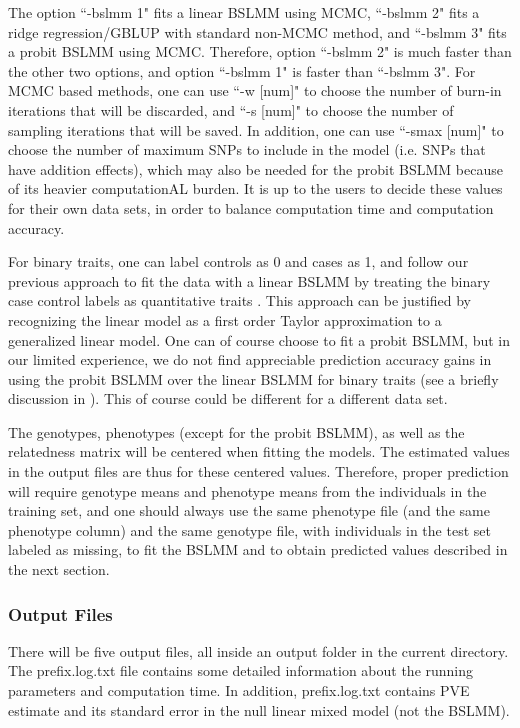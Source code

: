 \documentclass[11pt]{article}
\begin{document}
The option ``-bslmm 1" fits a linear BSLMM using MCMC, ``-bslmm 2"
fits a ridge regression/GBLUP with standard non-MCMC method, and
``-bslmm 3" fits a probit BSLMM using MCMC. Therefore, option ``-bslmm
2" is much faster than the other two options, and option ``-bslmm 1"
is faster than ``-bslmm 3". For MCMC based methods, one can use ``-w
[num]" to choose the number of burn-in iterations that will be
discarded, and ``-s [num]" to choose the number of sampling iterations
that will be saved. In addition, one can use ``-smax [num]" to choose
the number of maximum SNPs to include in the model (i.e. SNPs that
have addition effects), which may also be needed for the probit BSLMM
because of its heavier computationAL burden. It is up to the users to
decide these values for their own data sets, in order to balance
computation time and computation accuracy.

For binary traits, one can label controls as 0 and cases as 1, and
follow our previous approach to fit the data with a linear BSLMM by
treating the binary case control labels as quantitative traits
\cite{Zhou:2013}. This approach can be justified by recognizing the
linear model as a first order Taylor approximation to a generalized
linear model. One can of course choose to fit a probit BSLMM, but in
our limited experience, we do not find appreciable prediction accuracy
gains in using the probit BSLMM over the linear BSLMM for binary
traits (see a briefly discussion in \cite{Zhou:2013}). This of course
could be different for a different data set.

The genotypes, phenotypes (except for the probit BSLMM), as well as
the relatedness matrix will be centered when fitting the models. The
estimated values in the output files are thus for these centered
values. Therefore, proper prediction will require genotype means and
phenotype means from the individuals in the training set, and one
should always use the same phenotype file (and the same phenotype
column) and the same genotype file, with individuals in the test set
labeled as missing, to fit the BSLMM and to obtain predicted values
described in the next section.

\subsubsection{Output Files}

There will be five output files, all inside an output folder in the
current directory. The prefix.log.txt file contains some detailed
information about the running parameters and computation time. In
addition, prefix.log.txt contains PVE estimate and its standard error
in the null linear mixed model (not the BSLMM).
\end{document}
